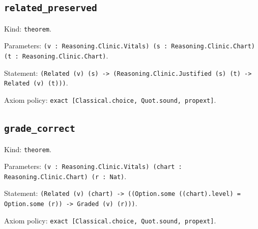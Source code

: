 \documentclass[11pt]{article}
\begin{document}
\subsection*{\texttt{related\_preserved}}
\noindent Kind: \texttt{theorem}.\par
\noindent Parameters: \texttt{(v : Reasoning.Clinic.Vitals) (s : Reasoning.Clinic.Chart) (t : Reasoning.Clinic.Chart)}.\par
\noindent Statement: \texttt{(Related (v) (s) -> (Reasoning.Clinic.Justified (s) (t) -> Related (v) (t)))}.\par
\noindent Axiom policy: \texttt{exact [Classical.choice, Quot.sound, propext]}.\par
\subsection*{\texttt{grade\_correct}}
\noindent Kind: \texttt{theorem}.\par
\noindent Parameters: \texttt{(v : Reasoning.Clinic.Vitals) (chart : Reasoning.Clinic.Chart) (r : Nat)}.\par
\noindent Statement: \texttt{(Related (v) (chart) -> ((Option.some ((chart).level) = Option.some (r)) -> Graded (v) (r)))}.\par
\noindent Axiom policy: \texttt{exact [Classical.choice, Quot.sound, propext]}.\par
\end{document}
